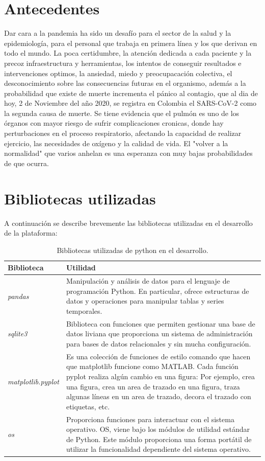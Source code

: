 \documentclass[conference,compsoc,onecolumn]{IEEEtran}
\begin{document}
\section{Antecedentes}
Dar cara a la pandemia ha sido un desafío para el sector de la salud y la epidemiología, para el personal que trabaja en primera línea y los que derivan en todo el mundo. La poca certidumbre, la atención dedicada a cada paciente y la precoz infraestructura y herramientas, los intentos de conseguir resultados e intervenciones optimos, la ansiedad, miedo y preocupacación colectiva, el desconocimiento sobre las consecuencias futuras en el organismo, además a la probabilidad que existe de muerte incrementa el pánico al contagio, que al dia de hoy, 2 de Noviembre del año 2020, se registra en Colombia el SARS-CoV-2  como la segunda causa de muerte. 
\medskip
Se tiene evidencia que el pulmón es uno de los órganos con mayor riesgo de sufrir complicaciones cronicas, donde hay perturbaciones en el proceso respiratorio, afectando la capacidad de realizar ejercicio, las necesidades de oxígeno y la calidad de vida. El "volver a la normalidad" que varios anhelan es una esperanza con muy bajas probabilidades de que ocurra. 
\label{sec:results}

\section{Bibliotecas utilizadas}
A continuación se describe brevemente las bibliotecas utilizadas en el desarrollo de la plataforma:

 \begin{table}[H]
    \centering
    \begin{tabular}[c]{| m{15em} | m{35em} |} 
     \hline
     \textbf{Biblioteca} & \textbf{Utilidad}\\
     \hline
      \textit{pandas} & Manipulación y análisis de datos para el lenguaje de programación Python. En particular, ofrece estructuras de datos y operaciones para manipular tablas y series temporales.\\ 
     \hline
      \textit{sqlite3} & Biblioteca con funciones que permiten gestionar una base de datos liviana que proporciona un sistema de administración para bases de datos relacionales y sin mucha configuración.\\
     \hline
      \textit{matplotlib.pyplot} & Es una colección de funciones de estilo comando que hacen que matplotlib funcione como MATLAB. Cada función pyplot realiza algún cambio en una figura: Por ejemplo, crea una figura, crea un area de trazado en una figura, traza algunas líneas en un area de trazado, decora el trazado con etiquetas, etc.  \\ 
     \hline
      \textit{os} & Proporciona funciones para interactuar con el sistema operativo. OS, viene bajo los módulos de utilidad estándar de Python. Este módulo proporciona una forma portátil de utilizar la funcionalidad dependiente del sistema operativo. \\
     \hline
    \end{tabular}
    \caption{Bibliotecas utilizadas de python en el desarrollo.}
    \label{table:ta}
    \end{table}
\end{document}
